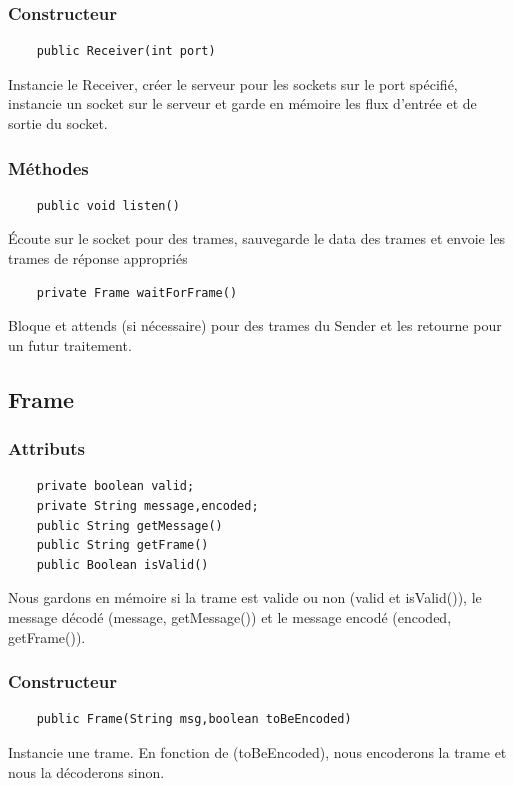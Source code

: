 \documentclass[a4paper,12pt]{article}
\begin{document}
\begin{spacing}{1}
	\subsubsection*{Constructeur}
	\begin{lstlisting}
	public Receiver(int port)
	\end{lstlisting}
	Instancie le Receiver, créer le serveur pour les sockets sur le port spécifié, instancie un socket sur le serveur et garde en mémoire les flux d'entrée et de sortie du socket.
	\subsubsection*{Méthodes}
	\begin{lstlisting}
	public void listen()
	\end{lstlisting}
	Écoute sur le socket pour des trames, sauvegarde le data des trames et envoie les trames de réponse appropriés
	\begin{lstlisting}
	private Frame waitForFrame()
	\end{lstlisting}
	Bloque et attends (si nécessaire) pour des trames du Sender et les retourne pour un futur traitement.
	\subsection*{Frame}
	\subsubsection*{Attributs}
	\begin{lstlisting}
	private boolean valid;
	private String message,encoded;	
	public String getMessage()
	public String getFrame() 
	public Boolean isValid()
	\end{lstlisting}
	Nous gardons en mémoire si la trame est valide ou non (valid et isValid()), le message décodé (message, getMessage()) et le message encodé (encoded, getFrame()).
	\subsubsection*{Constructeur}
	\begin{lstlisting}
	public Frame(String msg,boolean toBeEncoded)
	\end{lstlisting}
	Instancie une trame. En fonction de (toBeEncoded), nous encoderons la trame et nous la décoderons sinon.

\end{spacing}
\end{document}
